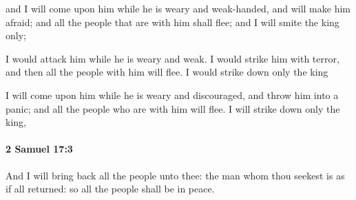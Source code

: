 			\begin{versebox}
					\item[BHS] 
					\item[ASV] and I will come upon him while he is weary and weak-handed, and will make him afraid; and all the people that are with him shall flee; and I will smite the king only;
					\item[NIV] I would attack him while he is weary and weak. I would strike him with terror, and then all the people with him will flee. I would strike down only the king
					\item[NRSV] I will come upon him while he is weary and discouraged, and throw him into a panic; and all the people who are with him will flee. I will strike down only the king,
			\end{versebox}

		\paragraph{2 Samuel 17:3} %
			\label{2SAMUEL-17-3}

			And I will bring back all the people unto thee: the man whom thou seekest is as if all returned: so all the people shall be in peace.

